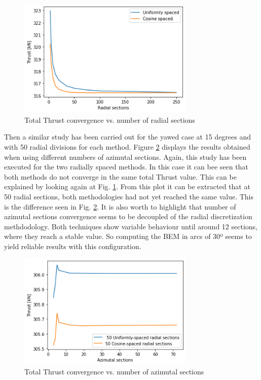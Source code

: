 \begin{figure}[htbp]
\includegraphics[width=0.75\textwidth]{./img/Thrust_convergence_plt.png}
\caption{Total Thrust convergence vs. number of radial sections}
\centering
\label{thrust_conv_alligned}
\end{figure}

Then a similar study has been carried out for the yawed case at 15 degrees and with 50 radial divisions for each method. Figure \ref{Thrust_conv_az_plt} displays the results obtained when using different numbers of azimutal sections. Again, this study has been executed for the two radially spaced methods. In this case it can bee seen that both methods do not converge in the same total Thrust value. This can be explained by looking again at Fig. \ref{thrust_conv_alligned}. From this plot it can be extracted that at 50 radial sections, both methodologies had not yet reached the same value. This is the difference seen in Fig. \ref{Thrust_conv_az_plt}. It is also worth to highlight that number of azimutal sections convergence seems to be decoupled of the radial discretization methdodology. Both techniques show variable behaviour until around 12 sections, where they reach a stable value. So computing the BEM in arcs of 30º seems to yield reliable results with this configuration.  


\begin{figure}[htbp]
\includegraphics[width=0.75\textwidth]{./img/Thrust_conv_az_plt.png}
\caption{Total Thrust convergence vs. number of azimutal sections}
\centering
\label{Thrust_conv_az_plt}
\end{figure}



